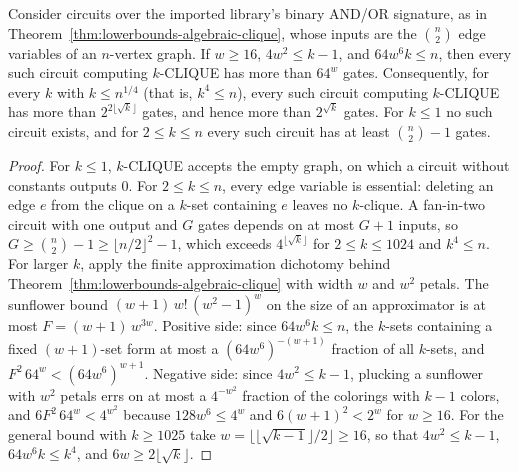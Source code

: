 \begin{theorem}
  \label{thm:lowerbounds-algebraic-clique-sqrt}
  \leanok
  Consider circuits over the imported library's binary AND/OR signature, as in
  Theorem~\ref{thm:lowerbounds-algebraic-clique}, whose inputs are the
  $\binom{n}{2}$ edge variables of an $n$-vertex graph. If $w \ge 16$,
  $4w^2 \le k - 1$, and $64 w^6 k \le n$, then every such circuit computing
  $k$-CLIQUE has more than $64^w$ gates. Consequently, for every $k$ with
  $k \le n^{1/4}$ (that is, $k^4 \le n$), every such circuit computing
  $k$-CLIQUE has more than $2^{2 \lfloor \sqrt{k} \rfloor}$ gates, and hence
  more than $2^{\sqrt{k}}$ gates. For $k \le 1$ no such circuit exists, and for
  $2 \le k \le n$ every such circuit has at least $\binom{n}{2} - 1$ gates.
\end{theorem}
\begin{proof}
  \leanok
  For $k \le 1$, $k$-CLIQUE accepts the empty graph, on which a circuit
  without constants outputs $0$. For $2 \le k \le n$, every edge variable is
  essential: deleting an edge $e$ from the clique on a $k$-set containing $e$
  leaves no $k$-clique. A fan-in-two circuit with one output and $G$ gates
  depends on at most $G + 1$ inputs, so $G \ge \binom{n}{2} - 1 \ge
  \lfloor n/2 \rfloor^2 - 1$, which exceeds $4^{\lfloor \sqrt{k} \rfloor}$ for
  $2 \le k \le 1024$ and $k^4 \le n$. For larger $k$, apply the finite
  approximation dichotomy behind
  Theorem~\ref{thm:lowerbounds-algebraic-clique} with width $w$ and $w^2$
  petals. The sunflower bound $(w + 1)\,w!\,(w^2 - 1)^w$ on the size of an
  approximator is at most $F = (w + 1)\,w^{3w}$. Positive side: since
  $64 w^6 k \le n$, the $k$-sets containing a fixed $(w + 1)$-set form at
  most a $(64 w^6)^{-(w + 1)}$ fraction of all $k$-sets, and
  $F^2\, 64^w < (64 w^6)^{w + 1}$. Negative side: since $4w^2 \le k - 1$,
  plucking a sunflower with $w^2$ petals errs on at most a $4^{-w^2}$ fraction
  of the colorings with $k - 1$ colors, and $6F^2\, 64^w < 4^{w^2}$ because
  $128 w^6 \le 4^w$ and $6(w + 1)^2 < 2^w$ for $w \ge 16$. For the general
  bound with $k \ge 1025$ take
  $w = \lfloor \lfloor \sqrt{k - 1} \rfloor / 2 \rfloor \ge 16$, so that
  $4w^2 \le k - 1$, $64 w^6 k \le k^4$, and $6w \ge 2 \lfloor \sqrt{k} \rfloor$.
\end{proof}

